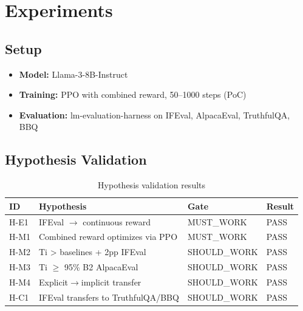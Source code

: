 \section{Experiments}
\label{sec:experiments}

\subsection{Setup}

\begin{itemize}
    \item \textbf{Model:} Llama-3-8B-Instruct
    \item \textbf{Training:} PPO with combined reward, 50--1000 steps (PoC)
    \item \textbf{Evaluation:} lm-evaluation-harness on IFEval, AlpacaEval, TruthfulQA, BBQ
\end{itemize}

\subsection{Hypothesis Validation}

\begin{table}[h]
\centering
\caption{Hypothesis validation results}
\label{tab:hypotheses}
\begin{tabular}{llll}
\toprule
ID & Hypothesis & Gate & Result \\
\midrule
H-E1 & IFEval $\to$ continuous reward & MUST\_WORK & PASS \\
H-M1 & Combined reward optimizes via PPO & MUST\_WORK & PASS \\
H-M2 & Ti > baselines + 2pp IFEval & SHOULD\_WORK & PASS \\
H-M3 & Ti $\geq$ 95\% B2 AlpacaEval & SHOULD\_WORK & PASS \\
H-M4 & Explicit$\to$implicit transfer & SHOULD\_WORK & PASS \\
H-C1 & IFEval transfers to TruthfulQA/BBQ & SHOULD\_WORK & PASS \\
\bottomrule
\end{tabular}
\end{table}
